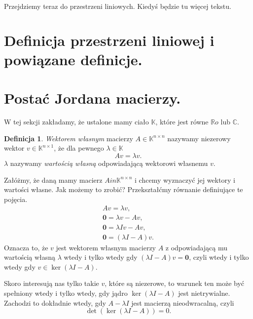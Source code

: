 \documentclass{book}
\theoremstyle{definition}
\newtheorem{definition}{Definicja}[section]
\begin{document}
Przejdziemy teraz do przestrzeni liniowych.
Kiedyś będzie tu więcej tekstu.

\section{Definicja przestrzeni liniowej i powiązane definicje.}


\section{Postać Jordana macierzy.}

W tej sekcji zakładamy,
	że ustalone mamy ciało $\mathbb{K}$,
	które jest równe $\mathbb{R}o$ lub $\mathbb{C}$.

\begin{definition}
	\textit{Wektorem własnym} macierzy $A \in \mathbb{K}^{n \times n}$
		nazywamy niezerowy wektor $v \in \mathbb{K}^{n \times 1}$,
		że dla pewnego $\lambda \in \mathbb{K}$
	\begin{equation}
		Av = \lambda v.
	\end{equation}
	$\lambda$ nazywamy \textit{wartością własną} odpowiadającą wektorowi własnemu $v$.
\end{definition}

Załóżmy,
	że daną mamy macierz $A in \mathbb{K}^{n \times n}$
	i chcemy wyznaczyć jej wektory i wartości własne.
Jak możemy to zrobić?
Przekształćmy równanie definiujące te pojęcia.
\begin{align}
	Av = \lambda v, \\
	\textbf{0} = \lambda v - Av, \\
	\textbf{0} = \lambda I v - Av, \\
	\textbf{0} = (\lambda I - A) v.
\end{align}
Oznacza to,
	że $v$ jest wektorem własnym macierzy $A$ z odpowiadającą mu wartością własną $\lambda$
	wtedy i tylko wtedy gdy $(\lambda I - A) v = \textbf{0}$,
	czyli wtedy i tylko wtedy gdy $v \in \ker(\lambda I - A)$.

Skoro interesują nas tylko takie $v$,
	które są niezerowe,
	to warunek ten może być spełniony wtedy i tylko wtedy,
	gdy jądro $\ker(\lambda I - A)$ jest nietrywialne.
Zachodzi to dokładnie wtedy,
	gdy $A - \lambda I$ jest macierzą nieodwracalną,
	czyli
\begin{equation}\label{eq:eigen-condition}
	\det(\ker(\lambda I - A)) = 0.
\end{equation}
\end{document}
